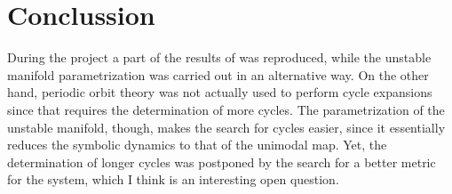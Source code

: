 \documentclass[pre,preprint,groupedaddress,showpacs,showkeys]{revtex4}
\begin{document}
\section{Conclussion}

 During the project a part of the results of \cite{Christiansen:97}
 was reproduced, while the unstable manifold parametrization was
 carried out in an alternative way. On the other hand, periodic orbit
 theory was not actually used to perform cycle expansions since that
 requires the determination of more cycles. The parametrization of the
 unstable manifold, though, makes the search for cycles easier, since
 it essentially reduces the symbolic dynamics to that of the unimodal map.
 Yet, the determination of longer cycles was postponed by the search for a better metric for the
 system, which I think is an interesting open question.








 
 
 \nocite{*}
\end{document}
